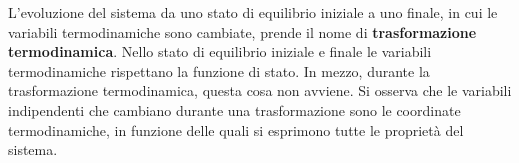 \documentclass[10pt,a4paper]{book}
\begin{document}
L'evoluzione del sistema da uno stato di equilibrio iniziale a uno finale, in cui le variabili termodinamiche sono cambiate, prende il nome di \textbf{trasformazione termodinamica}. Nello stato di equilibrio iniziale e finale le variabili termodinamiche rispettano la funzione di stato. In mezzo, durante la trasformazione termodinamica, questa cosa non avviene. Si osserva che le variabili indipendenti che cambiano durante una trasformazione sono le coordinate termodinamiche, in funzione delle quali si esprimono tutte le proprietà del sistema.
\begin{figure}[htpb]
	\centering
	


	\begin{tikzpicture}[x=0.75pt,y=0.75pt,yscale=-1,xscale=1]


\end{tikzpicture}
\end{figure}
\end{document}
